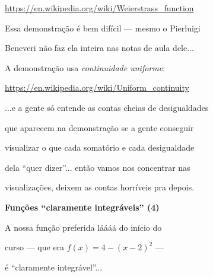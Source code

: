 \documentclass[oneside,12pt]{article}
\begin{document}
{\footnotesize

\url{https://en.wikipedia.org/wiki/Weierstrass_function}

}

\msk

Essa demonstração é bem difícil --- mesmo o Pierluigi

Beneveri não faz ela inteira nas notas de aula dele...

A demonstração usa {\sl continuidade uniforme}:

\ssk

{\footnotesize

\url{https://en.wikipedia.org/wiki/Uniform_continuity}

}

\msk

...e a gente só entende as contas cheias de desigualdades

que aparecem na demonstração se a gente conseguir

visualizar o que cada somatório e cada desigualdade

dela ``quer dizer''... então vamos nos concentrar nas

visualizações, deixem as contas horríveis pra depois.

\newpage


{\bf Funções ``claramente integráveis'' (4)}

A nossa função preferida láááá do início do

curso --- que era $f(x) = 4 - (x-2)^2$ ---

é ``claramente integrável''...


\pu

\def\fwithapprs#1{%
  \vcenter{\hbox{%
    \beginpicture(0,0)(4,4)
    \pictgrid%
    #1%
    \pictpiecewise{%
      (0,0)--%
      (0.25,0.938)--%
      (0.5,1.75)--%
      (0.75,2.438)--%
      (1,3)--%
      (1.25,3.438)--%
      (1.5,3.75)--%
      (1.75,3.938)--%
      (2,4)--%
      (2.25,3.938)--%
      (2.5,3.75)--%
      (2.75,3.438)--%
      (3,3)--%
      (3.25,2.438)--%
      (3.5,1.75)--%
      (3.75,0.938)--%
      (4,0)%
      }%
    \pictaxes%
    \end{picture}%
  }}}
\end{document}
